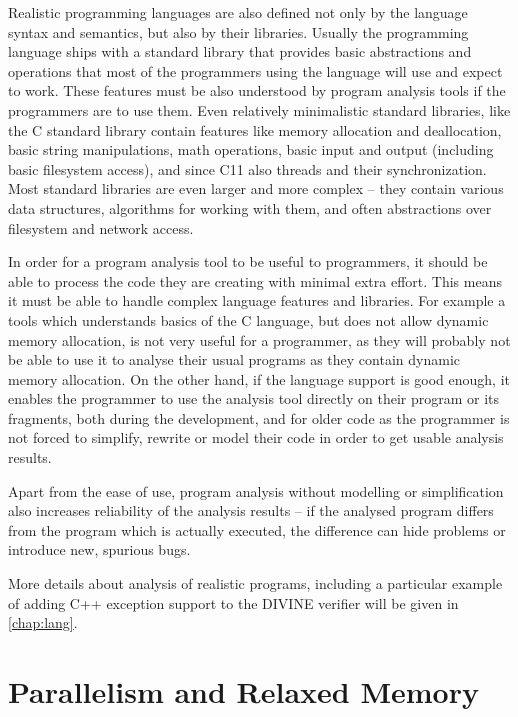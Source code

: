 Realistic programming languages are also defined not only by the language syntax and semantics, but also by their libraries.
Usually the programming language ships with a standard library that provides basic abstractions and operations that most of the programmers using the language will use and expect to work.
These features must be also understood by program analysis tools if the programmers are to use them.
Even relatively minimalistic standard libraries, like the C standard library contain features like memory allocation and deallocation, basic string manipulations, math operations, basic input and output (including basic filesystem access), and since C11 also threads and their synchronization.
Most standard libraries are even larger and more complex -- they contain various data structures, algorithms for working with them, and often abstractions over filesystem and network access.

In order for a program analysis tool to be useful to programmers, it should be able to process the code they are creating with minimal extra effort.
This means it must be able to handle complex language features and libraries.
For example a tools which understands basics of the C language, but does not allow dynamic memory allocation, is not very useful for a programmer, as they will probably not be able to  use it to analyse their usual programs as they contain dynamic memory allocation.
On the other hand, if the language support is good enough, it enables the programmer to use the analysis tool directly on their program or its fragments, both during the development, and for older code as the programmer is not forced to simplify, rewrite or model their code in order to get usable analysis results.

Apart from the ease of use, program analysis without modelling or simplification also increases reliability of the analysis results --
if the analysed program differs from the program which is actually executed, the difference can hide problems or introduce new, spurious bugs.

More details about analysis of realistic programs, including a particular
example of adding C++ exception support to the DIVINE verifier will be given in
\autoref{chap:lang}.

\section{Parallelism and Relaxed Memory}

